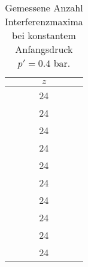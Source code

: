 \begin{table}[!htp]
\centering
\caption{Gemessene Anzahl Interferenzmaxima bei konstantem Anfangsdruck $p' = 0.4$ bar.}
\label{tab:messung2}
\begin{tabular}{c}
\toprule
{$z$} \\
\midrule
24 \\
24 \\
24 \\
24 \\
24 \\
24 \\
24 \\
24 \\
24 \\
24 \\
\bottomrule
\end{tabular}
\end{table}
